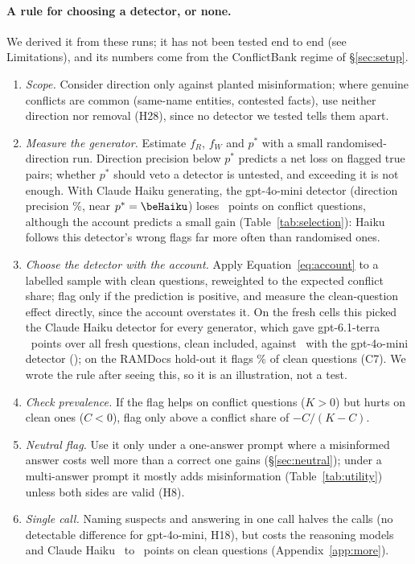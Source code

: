 \paragraph{A rule for choosing a detector, or none.}
We derived it from these runs; it has not been tested end to end (see Limitations), and its numbers come from the
ConflictBank regime of \S\ref{sec:setup}.
\begin{enumerate}[leftmargin=*,itemsep=1pt,topsep=2pt]
\item \emph{Scope.} Consider direction only against planted misinformation; where genuine conflicts are common
(same-name entities, contested facts), use neither direction nor removal (H28), since no detector we tested tells
them apart.
\item \emph{Measure the generator.} Estimate $f_R$, $f_W$ and $p^*$ with a small randomised-direction run.
Direction precision below $p^*$ predicts a net loss on flagged true pairs; whether $p^*$ should veto a detector is
untested, and exceeding it is not enough. With Claude Haiku generating, the gpt-4o-mini detector (direction
precision \ssPrecMini\%, near $p^*=\beHaiku$) loses \aselHaikuMiniObs\ points on conflict questions, although the
account predicts a small gain (Table~\ref{tab:selection}): Haiku follows this detector's wrong flags far more often
than randomised ones.
\item \emph{Choose the detector with the account.} Apply Equation~\eqref{eq:account} to a labelled sample with clean
questions, reweighted to the expected conflict share; flag only if the prediction is positive, and measure the
clean-question effect directly, since the account overstates it. On the fresh cells this picked the Claude Haiku
detector for every generator, which gave gpt-6.1-terra \frSelTerraObs\ points over all fresh questions, clean
included, against \frMiniDetTerraObs\ with the gpt-4o-mini detector (); on the RAMDocs hold-out it flags
\cxHdHaikuFlagClean\% of clean questions (C7). We wrote the rule after seeing this, so
it is an illustration, not a test.
\item \emph{Check prevalence.} If the flag helps on conflict questions ($K>0$) but hurts on clean ones ($C<0$), flag
only above a conflict share of $-C/(K-C)$.
\item \emph{Neutral flag.} Use it only under a one-answer prompt where a misinformed answer costs well more than a
correct one gains (\S\ref{sec:neutral}); under a multi-answer prompt it mostly adds misinformation
(Table~\ref{tab:utility}) unless both sides are valid (H8).
\item \emph{Single call.} Naming suspects and answering in one call halves the calls (no detectable difference for
gpt-4o-mini, H18), but costs the reasoning models and Claude Haiku \azSgHaikuSelfIdentifyClean\ to
\azSgLunaSelfIdentifyClean\ points on clean questions (Appendix~\ref{app:more}).
\end{enumerate}
